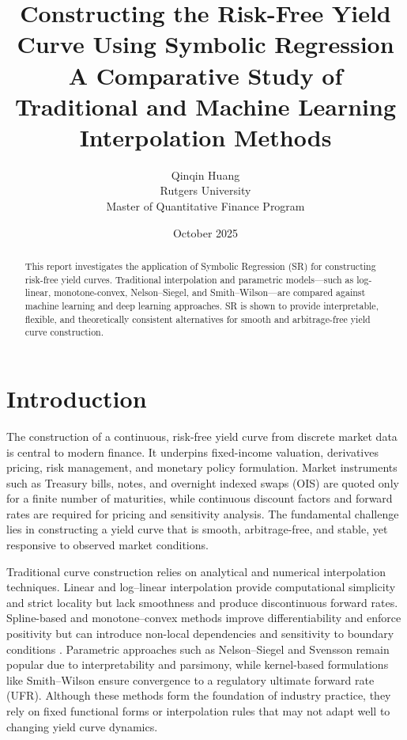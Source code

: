 \documentclass[12pt]{report}
\title{\Huge \textbf{Constructing the Risk-Free Yield Curve Using Symbolic Regression} \\[10pt]
       \large A Comparative Study of Traditional and Machine Learning Interpolation Methods}
\author{\Large Qinqin Huang \\[6pt]
        \normalsize Rutgers University \\[4pt]
        Master of Quantitative Finance Program}
\date{October 2025}
\begin{document}

\maketitle
\thispagestyle{empty}
\newpage

\begin{abstract}
\noindent
This report investigates the application of Symbolic Regression (SR) for constructing risk-free yield curves.
Traditional interpolation and parametric models---such as log-linear, monotone-convex, Nelson--Siegel, and Smith--Wilson---are compared against machine learning and deep learning approaches.
SR is shown to provide interpretable, flexible, and theoretically consistent alternatives for smooth and arbitrage-free yield curve construction.
\end{abstract}

\newpage
\tableofcontents
\newpage

\chapter{Introduction}

The construction of a continuous, risk-free yield curve from discrete market data is central to modern finance.  
It underpins fixed-income valuation, derivatives pricing, risk management, and monetary policy formulation.  
Market instruments such as Treasury bills, notes, and overnight indexed swaps (OIS) are quoted only for a finite number of maturities, while continuous discount factors and forward rates are required for pricing and sensitivity analysis.  
The fundamental challenge lies in constructing a yield curve that is smooth, arbitrage-free, and stable, yet responsive to observed market conditions.

Traditional curve construction relies on analytical and numerical interpolation techniques.  
Linear and log–linear interpolation provide computational simplicity and strict locality but lack smoothness and produce discontinuous forward rates.  
Spline-based and monotone–convex methods improve differentiability and enforce positivity but can introduce non-local dependencies and sensitivity to boundary conditions \parencite{HaganWest2006,BrigoMercurio2006,Filipovic2009}.  
Parametric approaches such as Nelson–Siegel and Svensson \parencite{NelsonSiegel1987,Svensson1994} remain popular due to interpretability and parsimony, while kernel-based formulations like Smith–Wilson \parencite{SmithWilson2001,EIOPA2018} ensure convergence to a regulatory ultimate forward rate (UFR).  
Although these methods form the foundation of industry practice, they rely on fixed functional forms or interpolation rules that may not adapt well to changing yield curve dynamics.
\end{document}
